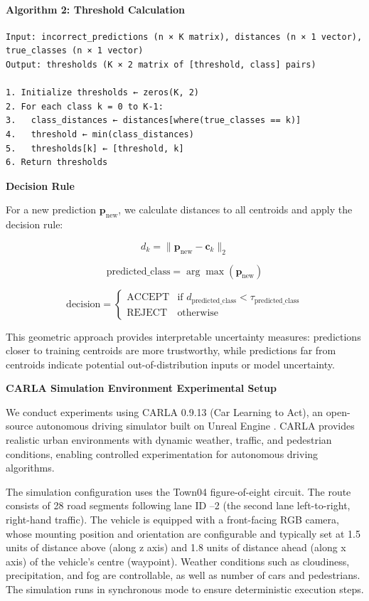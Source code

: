 \paragraph{Algorithm 2: Threshold Calculation}
\begin{verbatim}
Input: incorrect_predictions (n × K matrix), distances (n × 1 vector), 
true_classes (n × 1 vector)
Output: thresholds (K × 2 matrix of [threshold, class] pairs)

1. Initialize thresholds ← zeros(K, 2)
2. For each class k = 0 to K-1:
3.   class_distances ← distances[where(true_classes == k)]
4.   threshold ← min(class_distances)
5.   thresholds[k] ← [threshold, k]
6. Return thresholds
\end{verbatim}

\textbf{Decision Rule}

For a new prediction $\mathbf{p}_{\text{new}}$, we calculate distances to all centroids and apply the decision rule:

$$d_k = \|\mathbf{p}_{\text{new}} - \mathbf{c}_k\|_2$$

$$\text{predicted\_class} = \arg\max(\mathbf{p}_{\text{new}})$$

$$\text{decision} = \begin{cases}
\text{ACCEPT} & \text{if } d_{\text{predicted\_class}} < \tau_{\text{predicted\_class}} \\
\text{REJECT} & \text{otherwise}
\end{cases}$$

This geometric approach provides interpretable uncertainty measures: predictions closer to training centroids are more trustworthy, while predictions far from centroids indicate potential out-of-distribution inputs or model uncertainty.

\textbf{CARLA Simulation Environment Experimental Setup}

We conduct experiments using CARLA 0.9.13 (Car Learning to Act), an open-source autonomous driving simulator built on Unreal Engine \cite{dosovitskiy17}. CARLA provides realistic urban environments with dynamic weather, traffic, and pedestrian conditions, enabling controlled experimentation for autonomous driving algorithms.

The simulation configuration uses the Town04 figure-of-eight circuit. The route consists of 28 road segments following lane ID –2 (the second lane left-to-right, right-hand traffic). The vehicle is equipped with a front-facing RGB camera, whose mounting position and orientation are configurable and typically set at 1.5 units of distance above (along z axis) and 1.8 units of distance ahead (along x axis) of the vehicle's centre (waypoint). Weather conditions such as cloudiness, precipitation, and fog are controllable, as well as number of cars and pedestrians. The simulation runs in synchronous mode to ensure deterministic execution steps.

